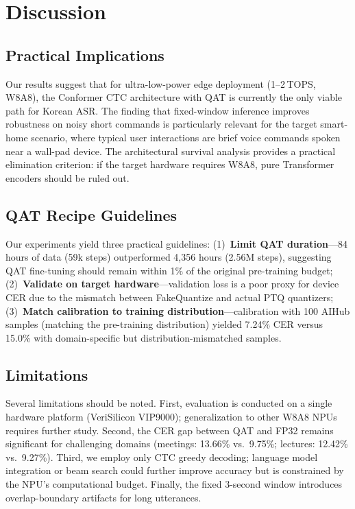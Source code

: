 \documentclass[a4paper,11pt,twocolumn]{article}
\begin{document}
\section{Discussion}

\subsection{Practical Implications}

Our results suggest that for ultra-low-power edge deployment (1--2\,TOPS, W8A8), the Conformer CTC architecture with QAT is currently the only viable path for Korean ASR. The finding that fixed-window inference improves robustness on noisy short commands is particularly relevant for the target smart-home scenario, where typical user interactions are brief voice commands spoken near a wall-pad device. The architectural survival analysis provides a practical elimination criterion: if the target hardware requires W8A8, pure Transformer encoders should be ruled out.

\subsection{QAT Recipe Guidelines}

Our experiments yield three practical guidelines: (1)~\textbf{Limit QAT duration}---84 hours of data (59k steps) outperformed 4,356 hours (2.56M steps), suggesting QAT fine-tuning should remain within 1\% of the original pre-training budget; (2)~\textbf{Validate on target hardware}---validation loss is a poor proxy for device CER due to the mismatch between FakeQuantize and actual PTQ quantizers; (3)~\textbf{Match calibration to training distribution}---calibration with 100 AIHub samples (matching the pre-training distribution) yielded 7.24\% CER versus 15.0\% with domain-specific but distribution-mismatched samples.

\subsection{Limitations}

Several limitations should be noted. First, evaluation is conducted on a single hardware platform (VeriSilicon VIP9000); generalization to other W8A8 NPUs requires further study. Second, the CER gap between QAT and FP32 remains significant for challenging domains (meetings: 13.66\% vs.\ 9.75\%; lectures: 12.42\% vs.\ 9.27\%). Third, we employ only CTC greedy decoding; language model integration or beam search could further improve accuracy but is constrained by the NPU's computational budget. Finally, the fixed 3-second window introduces overlap-boundary artifacts for long utterances.
\end{document}
